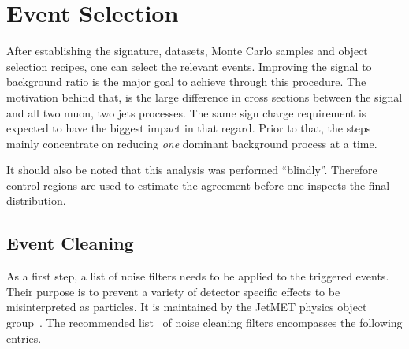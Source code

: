 \chapter{Event Selection}
\label{cha:eventsel}

After establishing the signature, datasets, Monte Carlo samples and object selection recipes, one can select the relevant events. Improving the signal to background ratio is the major goal to achieve through this procedure. The motivation behind that, is the large difference in cross sections between the signal and all two muon, two jets processes. The same sign charge requirement is expected to have the biggest impact in that regard. Prior to that, the steps mainly concentrate on reducing \textit{one} dominant background process at a time.

It should also be noted that this analysis was performed ``blindly''. Therefore control regions are used to estimate the agreement before one inspects the final distribution.

\section{Event Cleaning}
\label{sec:evclean}

As a first step, a list of noise filters needs to be applied to the triggered events. Their purpose is to prevent a variety of detector specific effects to be misinterpreted as particles. It is maintained by the JetMET physics object group~\cite{jmepog}. The recommended list~\cite{jmefilters} of noise cleaning filters encompasses the following entries.

